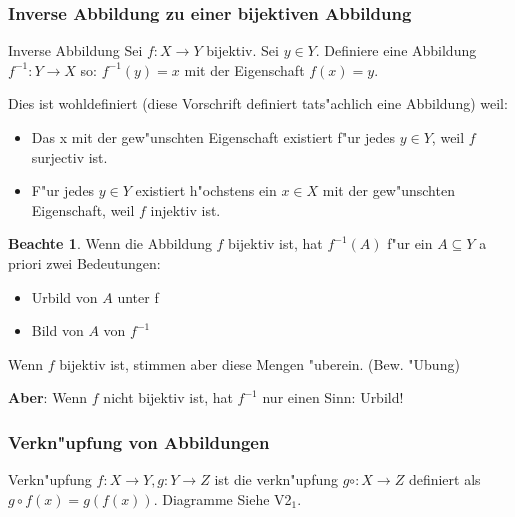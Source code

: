 \documentclass[11pt]{article}
\theoremstyle{remark}
\theoremstyle{definition}
\newtheorem*{notte}{Beachte}
\theoremstyle{remark}
\begin{document}
\subsubsection{Inverse Abbildung zu einer bijektiven Abbildung}
\label{sec:orgaae7124}
\begin{definition}{Inverse Abbildung}{}
Sei \(f:X\to Y\) bijektiv. Sei \(y\in Y\). Definiere eine Abbildung \(f^{-1}:
Y\to X\) so: \(f^{-1}(y)=x\) mit der Eigenschaft \(f(x)=y\).
\end{definition}

Dies ist wohldefiniert (diese Vorschrift definiert tats"achlich eine Abbildung)
weil:

\begin{relation}
\begin{itemize}
\item Das x mit der gew"unschten Eigenschaft existiert f"ur jedes \(y\in Y\), weil
\(f\) surjectiv ist.
\item F"ur jedes \(y\in Y\) existiert h"ochstens ein \(x\in X\) mit der gew"unschten
Eigenschaft, weil \(f\) injektiv ist.
\end{itemize}
\end{relation}

\begin{notte}
Wenn die Abbildung \(f\) bijektiv ist, hat \(f^{-1}(A)\) f"ur ein \(A\subseteq Y\) a
priori zwei Bedeutungen:
\begin{itemize}
\item Urbild von \(A\) unter f
\item Bild von \(A\) von \(f^{-1}\)
\end{itemize}

Wenn \(f\) bijektiv ist, stimmen aber diese Mengen "uberein. (Bew. "Ubung)

\textbf{Aber}: Wenn \(f\) nicht bijektiv ist, hat \(f^{-1}\) nur einen Sinn: Urbild!
\end{notte}

\subsubsection{Verkn"upfung von Abbildungen}
\label{sec:org540b965}
\begin{definition}{Verkn"upfung}{}
\(f: X\to Y, g: Y\to Z\) ist die verkn"upfung \(g\circ: X\to Z\) definiert
als \(g\circ f(x)=g(f(x))\). Diagramme Siehe V2\(_{\text{1}}\).
\end{definition}
\end{document}
